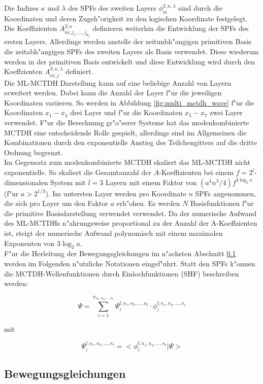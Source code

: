 Die Indizes $\kappa$ und $\lambda$ des SPFs des zweiten Layers $ \phi^{2;\kappa, \lambda}_{m}  $  sind durch die Koordinaten und deren
Zugeh"origkeit zu den logischen Koordinate festgelegt.
Die Koeffizienten $A^{2;\kappa}_{m;j_1,...,j_{d_\kappa}}$ definieren weiterhin die Entwicklung der SPFs des ersten Layers.
Allerdings werden anstelle der zeitunbh"angigen primitiven Basis die zeitabh"angigen SPFs des zweiten Layers als Basis verwendet.
Diese wiederum werden in der primitiven Basis entwickelt und diese Entwicklung wird durch den Koeffzienten  $A^{3;\kappa, \lambda}_{m;j}$
definiert.
  \\Die ML-MCTDH Darstellung kann auf eine beliebige Anzahl von Layern erweitert werden.
Dabei kann die Anzahl der Layer f"ur die jeweiligen Koordinaten variieren.
So werden in Abbildung \ref{fig:multi_mctdh_wave} f"ur die Koordinaten $x_1-x_4$ drei Layer und f"ur die Koordinaten $x_5 - x_7$ zwei Layer verwendet.
F"ur die Berechnung gr"o"serer Systeme hat das modenkombinierte MCTDH eine entscheidende Rolle gespielt, allerdings sind im Allgemeinen die Kombinationen
durch den exponentielle Anstieg des Teilchengitters auf die dritte Ordnung begrenzt. \cite{MCTDHreview3}
  \\Im Gegensatz zum modenkombinierte MCTDH skaliert das ML-MCTDH nicht exponentielle.
So skaliert die Gesamtanzahl der $A$-Koeffizienten bei einem $f=2^l$-dimensionalen System mit $l=3$ Layern mit einem Faktor von $(a^4n^{3}/4)f^{3\log_{2}a}$
(f"ur $a>2^{1/3}$). Im untersten Layer werden pro Koordinate $n$ SPFs angenommen, die sich pro Layer um den Faktor $a$ erh"ohen.
Es werden $N$ Basisfunktionen f"ur die primitive Basisdarstellung verwendet verwendet.
Da der numerische Aufwand des ML-MCTDHs n"ahrungsweise proportional zu der Anzahl der A-Koeffzienten ist, steigt der numerische Aufwand polynomisch
mit einem maximalen Exponenten von $3\log_{2}a$.\cite{Mreview2}
  \\F"ur die Herleitung der Bewegungsgleichungen im n"achsten Abschnitt \ref{sec:Bewegungsgleichungen} werden im Folgenden n"utzliche Notationen eingef"uhrt.
Statt den SPFs k"onnen die MCTDH-Wellenfunktionen durch Einlochfunktionen (SHF) \cite{Mreview2, MCTDHreview3} beschreiben werden:

 \begin{equation}
 \Psi=\sum^{n_{\kappa_1,\kappa_2,...,\kappa_l}}_{i=1} \Psi^{l;\kappa_1,\kappa_2,...,\kappa_l}_{i} \cdot  \phi^{l;\kappa_1,\kappa_2,...,\kappa_l}_{i}
 \label{Eq:MCTDH_SHF}
 \end{equation}

 mit

 \begin{equation}
   \Psi^{l;\kappa_1,\kappa_2,...,\kappa_l}_{i} = < \phi^{l;\kappa_1,\kappa_2,...,\kappa_l}_{i} | \Psi >
 \label{Eq:SHF}
 \end{equation}











\clearpage
 \subsection{Bewegungsgleichungen}
 \label{sec:Bewegungsgleichungen}
